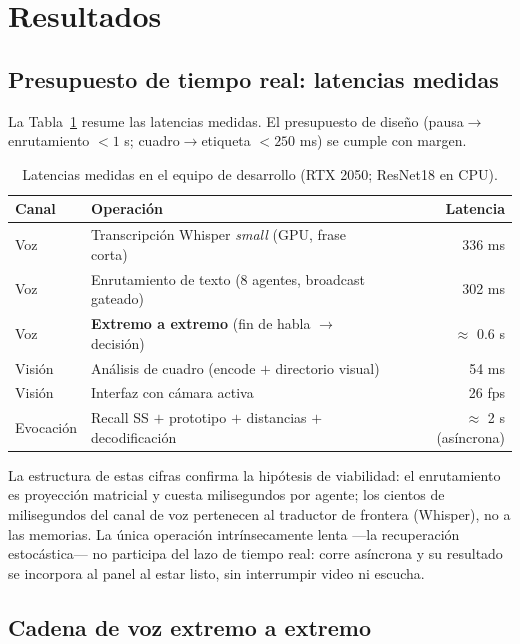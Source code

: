\section{Resultados}
\label{sec:resultados}

\subsection{Presupuesto de tiempo real: latencias medidas}
\label{sec:res_latencias}

La Tabla~\ref{tab:latencias} resume las latencias medidas.
El presupuesto de diseño (pausa$\to$enrutamiento $< 1$ s; cuadro$\to$etiqueta
$< 250$ ms) se cumple con margen.

\begin{table}[H]
\centering
\caption{Latencias medidas en el equipo de desarrollo (RTX 2050; ResNet18 en CPU).}
\label{tab:latencias}
\begin{tabular}{llr}
\toprule
Canal & Operación & Latencia \\
\midrule
Voz    & Transcripción Whisper \emph{small} (GPU, frase corta) & 336 ms \\
Voz    & Enrutamiento de texto (8 agentes, broadcast gateado)  & 302 ms \\
Voz    & \textbf{Extremo a extremo} (fin de habla $\to$ decisión) & $\approx$ 0.6 s \\
\midrule
Visión & Análisis de cuadro (encode $+$ directorio visual)     & 54 ms \\
Visión & Interfaz con cámara activa                            & 26 fps \\
\midrule
Evocación & Recall SS $+$ prototipo $+$ distancias $+$ decodificación
          & $\approx$ 2 s (asíncrona) \\
\bottomrule
\end{tabular}
\end{table}

La estructura de estas cifras confirma la hipótesis de viabilidad: el enrutamiento es
proyección matricial y cuesta milisegundos por agente; los cientos de milisegundos del
canal de voz pertenecen al traductor de frontera (Whisper), no a las memorias.
La única operación intrínsecamente lenta ---la recuperación estocástica--- no
participa del lazo de tiempo real: corre asíncrona y su resultado se incorpora al
panel al estar listo, sin interrumpir video ni escucha.

\subsection{Cadena de voz extremo a extremo}

